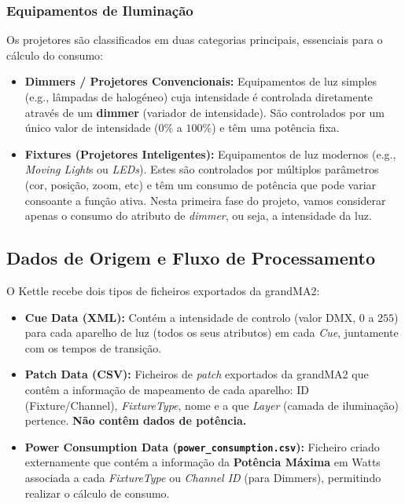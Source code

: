 \documentclass[a4paper, 12pt]{article}
\begin{document}
	\subsubsection{Equipamentos de Iluminação}
	Os projetores são classificados em duas categorias principais, essenciais para o cálculo do consumo:
	\begin{itemize}
		\item \textbf{Dimmers / Projetores Convencionais:} Equipamentos de luz simples (e.g., lâmpadas de halogéneo) cuja intensidade é controlada diretamente através de um \textbf{dimmer} (variador de intensidade). São controlados por um único valor de intensidade ($\text{0}\%$ a $\text{100}\%$) e têm uma potência fixa.
		\item \textbf{Fixtures (Projetores Inteligentes):} Equipamentos de luz modernos (e.g., \textit{Moving Light}s ou \textit{LEDs}). Estes são controlados por múltiplos parâmetros (cor, posição, zoom, etc) e têm um consumo de potência que pode variar consoante a função ativa. Nesta primeira fase do projeto, vamos considerar apenas o consumo do atributo de \textit{dimmer}, ou seja, a intensidade da luz.
	\end{itemize}
	
	\subsection{Dados de Origem e Fluxo de Processamento}
	
	O Kettle recebe dois tipos de ficheiros exportados da grandMA2:
	\begin{itemize}
		\item \textbf{Cue Data (XML):} Contém a intensidade de controlo (valor DMX, $\text{0}$ a $\text{255}$) para cada aparelho de luz (todos os seus atributos) em cada \textit{Cue}, juntamente com os tempos de transição.
	\item \textbf{Patch Data (CSV):} Ficheiros de \textit{patch} exportados da grandMA2 que contêm a informação de mapeamento de cada aparelho: ID (Fixture/Channel), \textit{FixtureType}, nome e a que \textit{Layer} (camada de iluminação) pertence. \textbf{Não contêm dados de potência.}
	\item \textbf{Power Consumption Data (\texttt{power\_consumption.csv}):} Ficheiro criado externamente que contém a informação da \textbf{Potência Máxima} em Watts associada a cada \textit{FixtureType} ou \textit{Channel ID} (para Dimmers), permitindo realizar o cálculo de consumo.
	\end{itemize}
	
\end{document}

